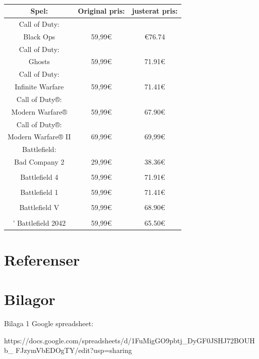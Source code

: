\documentclass[11p]{article}
\begin{document}
\begin{otherlanguage}{swedish}
\begin{table}[htbp]
\begin{tabular}{|c|c|c|}
            Spel: & Original pris: & justerat pris:  \\
            \hline
            Call of Duty: &&\\ [-2pt]
            Black Ops     & 59,99€ & €76.74\\
            \hline
            Call of Duty: &&\\ [-2pt]
            Ghosts        & 59,99€ & 71.91€\\
            \hline
            Call of Duty:    &&\\ [-2pt]
            Infinite Warfare & 59,99€ & 71.41€\\
            \hline
            Call of Duty®:  &&\\ [-2pt]
            Modern Warfare® & 59,99€ & 67.90€\\
            \hline
            Call of Duty®:     &&\\ [-2pt]
            Modern Warfare® II & 69,99€ & 69,99€\\
            \hline
            Battlefield:  &&\\ [-2pt]
            Bad Company 2 & 29,99€ & 38.36€ \\
            \hline
            &&\\ [-2pt]
            Battlefield 4 & 59,99€ & 71.91€\\
            \hline
            &&\\[-2pt]
            Battlefield 1 & 59,99€ & 71.41€\\
            \hline
            &&\\[-2pt]
            Battlefield V & 59,99€ & 68.90€ \\
            \hline
            &&\\[-2pt]
            '
            Battlefield 2042 & 59,99€ & 65.50€ \\
            \hline
        \end{tabular}
        \caption{}
        \label{tab:Inflation}
    \end{table}

    \newpage
    \section{Referenser}
    \printbibliography[heading=none]

    \newpage
    \section{Bilagor}
    Bilaga 1
    Google spreadsheet:

    https://docs.google.com/spreadsheets/d/1FuMigGO9pbtj\_DyGF0JSHJ72BOUHb\_
    FJzymVbEDOgTY/edit?usp=sharing


    \end{otherlanguage}
\end{document}
